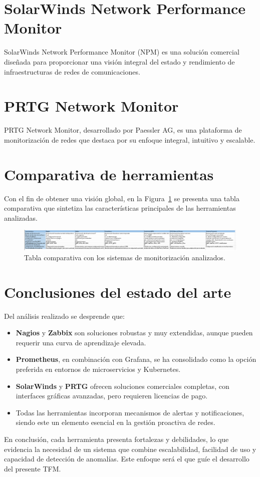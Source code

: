 
\section{SolarWinds Network Performance Monitor}
SolarWinds Network Performance Monitor (NPM) es una solución comercial diseñada para proporcionar una visión integral del estado y rendimiento de infraestructuras de redes de comunicaciones.


\section{PRTG Network Monitor}
PRTG Network Monitor, desarrollado por Paessler AG, es una plataforma de monitorización de redes que destaca por su enfoque integral, intuitivo y escalable.


\section{Comparativa de herramientas}
Con el fin de obtener una visión global, en la Figura~\ref{fig:comparativa} se presenta una tabla comparativa que sintetiza las características principales de las herramientas analizadas.

\begin{figure}[H]
    \centering
    \includegraphics[width=\textwidth]{imagenes/image13.png}
    \caption{Tabla comparativa con los sistemas de monitorización analizados.}
    \label{fig:comparativa}
\end{figure}

\section{Conclusiones del estado del arte}
Del análisis realizado se desprende que:
\begin{itemize}
    \item \textbf{Nagios} y \textbf{Zabbix} son soluciones robustas y muy extendidas, aunque pueden requerir una curva de aprendizaje elevada.
    \item \textbf{Prometheus}, en combinación con Grafana, se ha consolidado como la opción preferida en entornos de microservicios y Kubernetes.
    \item \textbf{SolarWinds} y \textbf{PRTG} ofrecen soluciones comerciales completas, con interfaces gráficas avanzadas, pero requieren licencias de pago.
    \item Todas las herramientas incorporan mecanismos de alertas y notificaciones, siendo este un elemento esencial en la gestión proactiva de redes.
\end{itemize}

En conclusión, cada herramienta presenta fortalezas y debilidades, lo que evidencia la necesidad de un sistema que combine escalabilidad, facilidad de uso y capacidad de detección de anomalías. Este enfoque será el que guíe el desarrollo del presente TFM.